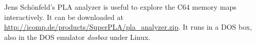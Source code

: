 Jens Schönfeld's PLA analyzer is useful to explore the C64 memory maps
interactively. It can be downloaded at
\url{http://icomp.de/products/SuperPLA/pla_analyzer.zip}. It runs in a DOS box,
also in the DOS emulator \textit{dosbox} under Linux.




\begin{thebibliography}{999}

\end{thebibliography}



